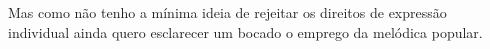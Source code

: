 
Mas como não tenho a mínima ideia de rejeitar os direitos de expressão
individual ainda quero esclarecer um bocado o emprego da melódica
popular.


